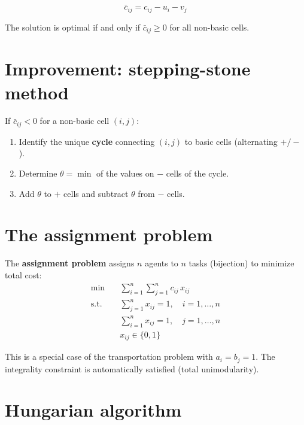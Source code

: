\begin{definition}
\[
  \bar{c}_{ij} = c_{ij} - u_i - v_j
\]
\end{definition}

\begin{theorem}
The solution is optimal if and only if $\bar{c}_{ij} \ge 0$ for all
non-basic cells.
\end{theorem}

\section{Improvement: stepping-stone method}

If $\bar{c}_{ij} < 0$ for a non-basic cell $(i,j)$:
\begin{enumerate}
  \item Identify the unique \textbf{cycle} connecting $(i,j)$ to basic cells
        (alternating $+/-$).
  \item Determine $\theta = \min$ of the values on $-$ cells of the cycle.
  \item Add $\theta$ to $+$ cells and subtract $\theta$ from $-$ cells.
\end{enumerate}

\section{The assignment problem}

\begin{definition}
The \textbf{assignment problem} assigns $n$ agents to $n$ tasks (bijection)
to minimize total cost:
\[
\begin{aligned}
  \min \quad & \sum_{i=1}^{n}\sum_{j=1}^{n} c_{ij}\, x_{ij} \\
  \text{s.t.} \quad
    & \sum_{j=1}^{n} x_{ij} = 1, \quad i = 1, \ldots, n \\
    & \sum_{i=1}^{n} x_{ij} = 1, \quad j = 1, \ldots, n \\
    & x_{ij} \in \{0, 1\}
\end{aligned}
\]
\end{definition}

\begin{remark}
This is a special case of the transportation problem with $a_i = b_j = 1$.
The integrality constraint is automatically satisfied (total unimodularity).
\end{remark}

\section{Hungarian algorithm}

